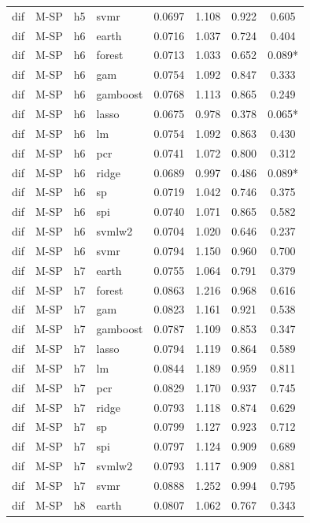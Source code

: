 \begin{ThreePartTable}
\begin{longtable}[t]{llclcccc}
dif & M-SP & h5 & svmr & 0.0697 & 1.108 & 0.922 & 0.605\\
\addlinespace
dif & M-SP & h6 & earth & 0.0716 & 1.037 & 0.724 & 0.404\\
dif & M-SP & h6 & forest & 0.0713 & 1.033 & 0.652 & 0.089*\\
dif & M-SP & h6 & gam & 0.0754 & 1.092 & 0.847 & 0.333\\
dif & M-SP & h6 & gamboost & 0.0768 & 1.113 & 0.865 & 0.249\\
dif & M-SP & h6 & lasso & 0.0675 & 0.978 & 0.378 & 0.065*\\
dif & M-SP & h6 & lm & 0.0754 & 1.092 & 0.863 & 0.430\\
dif & M-SP & h6 & pcr & 0.0741 & 1.072 & 0.800 & 0.312\\
dif & M-SP & h6 & ridge & 0.0689 & 0.997 & 0.486 & 0.089*\\
dif & M-SP & h6 & sp & 0.0719 & 1.042 & 0.746 & 0.375\\
dif & M-SP & h6 & spi & 0.0740 & 1.071 & 0.865 & 0.582\\
dif & M-SP & h6 & svmlw2 & 0.0704 & 1.020 & 0.646 & 0.237\\
dif & M-SP & h6 & svmr & 0.0794 & 1.150 & 0.960 & 0.700\\
\addlinespace
dif & M-SP & h7 & earth & 0.0755 & 1.064 & 0.791 & 0.379\\
dif & M-SP & h7 & forest & 0.0863 & 1.216 & 0.968 & 0.616\\
dif & M-SP & h7 & gam & 0.0823 & 1.161 & 0.921 & 0.538\\
dif & M-SP & h7 & gamboost & 0.0787 & 1.109 & 0.853 & 0.347\\
dif & M-SP & h7 & lasso & 0.0794 & 1.119 & 0.864 & 0.589\\
dif & M-SP & h7 & lm & 0.0844 & 1.189 & 0.959 & 0.811\\
dif & M-SP & h7 & pcr & 0.0829 & 1.170 & 0.937 & 0.745\\
dif & M-SP & h7 & ridge & 0.0793 & 1.118 & 0.874 & 0.629\\
dif & M-SP & h7 & sp & 0.0799 & 1.127 & 0.923 & 0.712\\
dif & M-SP & h7 & spi & 0.0797 & 1.124 & 0.909 & 0.689\\
dif & M-SP & h7 & svmlw2 & 0.0793 & 1.117 & 0.909 & 0.881\\
dif & M-SP & h7 & svmr & 0.0888 & 1.252 & 0.994 & 0.795\\
\addlinespace
dif & M-SP & h8 & earth & 0.0807 & 1.062 & 0.767 & 0.343\\

\end{longtable}
\end{ThreePartTable}
